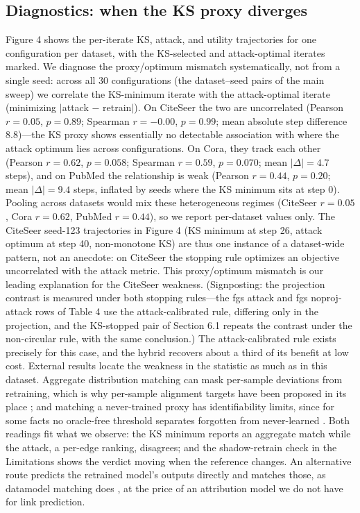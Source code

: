 \documentclass[pdflatex,sn-basic,Numbered]{sn-jnl}
\begin{document}
\subsection{Diagnostics: when the KS proxy diverges}
Figure 4 shows the per-iterate KS, attack, and utility trajectories for one configuration per dataset, with the KS-selected and attack-optimal iterates marked. We diagnose the proxy/optimum mismatch systematically, not from a single seed: across all 30 configurations (the dataset--seed pairs of the main sweep) we correlate the KS-minimum iterate with the attack-optimal iterate (minimizing $|$attack $-$ retrain$|$). On CiteSeer the two are uncorrelated (Pearson $r = 0.05$, $p = 0.89$; Spearman $r = -0.00$, $p = 0.99$; mean absolute step difference 8.8)---the KS proxy shows essentially no detectable association with where the attack optimum lies across configurations. On Cora, they track each other (Pearson $r = 0.62$, $p = 0.058$; Spearman $r = 0.59$, $p = 0.070$; mean $|\Delta| = 4.7$ steps), and on PubMed the relationship is weak (Pearson $r = 0.44$, $p = 0.20$; mean $|\Delta| = 9.4$ steps, inflated by seeds where the KS minimum sits at step 0). Pooling across datasets would mix these heterogeneous regimes (CiteSeer $r = 0.05$, Cora $r = 0.62$, PubMed $r = 0.44$), so we report per-dataset values only. The CiteSeer seed-123 trajectories in Figure 4 (KS minimum at step 26, attack optimum at step 40, non-monotone KS) are thus one instance of a dataset-wide pattern, not an anecdote: on CiteSeer the stopping rule optimizes an objective uncorrelated with the attack metric. This proxy/optimum mismatch is our leading explanation for the CiteSeer weakness. (Signposting: the projection contrast is measured under both stopping rules---the fgs attack and fgs noproj-attack rows of Table 4 use the attack-calibrated rule, differing only in the projection, and the KS-stopped pair of Section 6.1 repeats the contrast under the non-circular rule, with the same conclusion.) The attack-calibrated rule exists precisely for this case, and the hybrid recovers about a third of its benefit at low cost. External results locate the weakness in the statistic as much as in this dataset. Aggregate distribution matching can mask per-sample deviations from retraining, which is why per-sample alignment targets have been proposed in its place \cite{sala2026}; and matching a never-trained proxy has identifiability limits, since for some facts no oracle-free threshold separates forgotten from never-learned \cite{distrestore2026}. Both readings fit what we observe: the KS minimum reports an aggregate match while the attack, a per-edge ranking, disagrees; and the shadow-retrain check in the Limitations shows the verdict moving when the reference changes. An alternative route predicts the retrained model's outputs directly and matches those, as datamodel matching does \cite{dmm2024}, at the price of an attribution model we do not have for link prediction.
\end{document}
